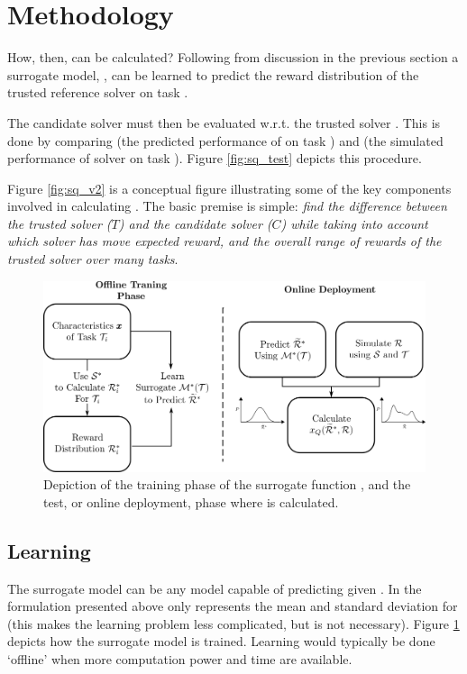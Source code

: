 \section{Methodology}
How, then, can \xQ{} be calculated? Following from discussion in the previous section a surrogate model, \surrogate{}, can be learned to predict the reward distribution \rwdstarapprox{} of the trusted reference solver \solvestar{} on task \task{}.

The candidate solver \solve{} must then be evaluated w.r.t. the trusted solver \solvestar{}. This is done by comparing \rwdstarapprox{} (the predicted performance of \solvestar{} on task \task) and \rwd{} (the simulated performance of solver \solve{} on task \task). Figure \ref{fig:sq_test} depicts this procedure.

Figure \ref{fig:sq_v2} is a conceptual figure illustrating some of the key components involved in calculating \xQ. The basic premise is simple: \emph{find the difference between the trusted solver ($T$) and the candidate solver ($C$) while taking into account which solver has move expected reward, and the overall range of rewards of the trusted solver over many tasks}.

\begin{figure}[tb]
    \centering
    \includegraphics[width=0.95\linewidth]{Figures/SQ_train_test.png}
    \caption{Depiction of the training phase of the surrogate function \surrogate, and the test, or online deployment, phase where \xQ{} is calculated.}
    \label{fig:sq_train}
\end{figure}%

\subsection{Learning \surrogate}
The surrogate model \surrogate{} can be any model capable of predicting \rwdstarapprox{} given \task. In the formulation presented above \rwdstariapprox{} only represents the mean and standard deviation for \rwdstari{} (this makes the learning problem less complicated, but is not necessary). Figure \ref{fig:sq_train} depicts how the surrogate model is trained. Learning \surrogate{} would typically be done `offline' when more computation power and time are available.

